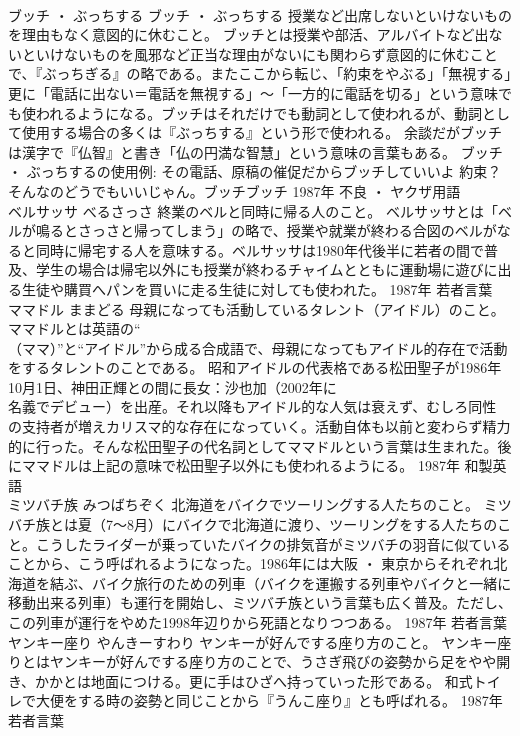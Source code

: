 \documentclass[8pt]{extreport}
\begin{document}
\begin{CJK}{UTF8}{min}
\\	ブッチ ・ ぶっちする	ブッチ ・ ぶっちする	授業など出席しないといけないものを理由もなく意図的に休むこと。	ブッチとは授業や部活、アルバイトなど出ないといけないものを風邪など正当な理由がないにも関わらず意図的に休むことで、『ぶっちぎる』の略である。またここから転じ、「約束をやぶる」「無視する」更に「電話に出ない＝電話を無視する」～「一方的に電話を切る」という意味でも使われるようになる。ブッチはそれだけでも動詞として使われるが、動詞として使用する場合の多くは『ぶっちする』という形で使われる。 余談だがブッチは漢字で『仏智』と書き「仏の円満な智慧」という意味の言葉もある。 ブッチ ・ ぶっちするの使用例: その電話、原稿の催促だからブッチしていいよ 約束？そんなのどうでもいいじゃん。ブッチブッチ	1987年	不良 ・ ヤクザ用語	
\\	ベルサッサ	べるさっさ	終業のベルと同時に帰る人のこと。	ベルサッサとは「ベルが鳴るとさっさと帰ってしまう」の略で、授業や就業が終わる合図のベルがなると同時に帰宅する人を意味する。ベルサッサは1980年代後半に若者の間で普及、学生の場合は帰宅以外にも授業が終わるチャイムとともに運動場に遊びに出る生徒や購買へパンを買いに走る生徒に対しても使われた。	1987年	若者言葉	
\\	ママドル	ままどる	母親になっても活動しているタレント（アイドル）のこと。	ママドルとは英語の“
\\	（ママ）”と“アイドル”から成る合成語で、母親になってもアイドル的存在で活動をするタレントのことである。 昭和アイドルの代表格である松田聖子が1986年10月1日、神田正輝との間に長女：沙也加（2002年に
\\	名義でデビュー）を出産。それ以降もアイドル的な人気は衰えず、むしろ同性
\\	の支持者が増えカリスマ的な存在になっていく。活動自体も以前と変わらず精力的に行った。そんな松田聖子の代名詞としてママドルという言葉は生まれた。後にママドルは上記の意味で松田聖子以外にも使われるようにる。	1987年	和製英語	
\\	ミツバチ族	みつばちぞく	北海道をバイクでツーリングする人たちのこと。	ミツバチ族とは夏（7～8月）にバイクで北海道に渡り、ツーリングをする人たちのこと。こうしたライダーが乗っていたバイクの排気音がミツバチの羽音に似ていることから、こう呼ばれるようになった。1986年には大阪 ・ 東京からそれぞれ北海道を結ぶ、バイク旅行のための列車（バイクを運搬する列車やバイクと一緒に移動出来る列車）も運行を開始し、ミツバチ族という言葉も広く普及。ただし、この列車が運行をやめた1998年辺りから死語となりつつある。	1987年	若者言葉	
\\	ヤンキー座り	やんきーすわり	ヤンキーが好んでする座り方のこと。	ヤンキー座りとはヤンキーが好んでする座り方のことで、うさぎ飛びの姿勢から足をやや開き、かかとは地面につける。更に手はひざへ持っていった形である。 和式トイレで大便をする時の姿勢と同じことから『うんこ座り』とも呼ばれる。	1987年	若者言葉	

\end{CJK}
\end{document}
